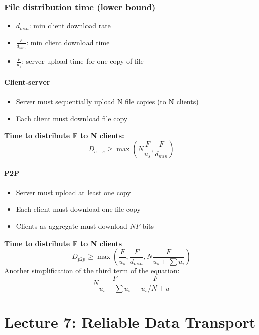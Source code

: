 \documentclass[a4paper]{article}
\begin{document}
\subsubsection{File distribution time (lower bound)}
\begin{itemize}
    \item $d_{min}$: min client download rate
    \item $\displaystyle\frac{F}{d_{min}}$: min client download time
    \item $\displaystyle\frac{F}{u_s}$: server upload time for one copy of file
\end{itemize}

\paragraph{Client-server}
\begin{itemize}
    \item Server must sequentially upload N file copies (to N clients)
    \item Each client must download file copy
\end{itemize}
\textbf{Time to distribute F to N clients:} $$ D_{c-s} \geq \max\left(N\frac{F}{u_s}, \frac{F}{d_{min}}\right)$$

\paragraph{P2P}
\begin{itemize}
    \item Server must upload at least one copy
    \item Each client must download one file copy
    \item Clients as aggregate must download $NF$ bits
\end{itemize}
\textbf{Time to distribute F to N clients} $$ D_{p2p} \geq \max\left(\frac{F}{u_s},\frac{F}{d_{min}}, N\frac{F}{u_s+\sum{u_i}}\right) $$
Another simplification of the third term of the equation: $$N\frac{F}{u_s+\sum{u_i}} = \frac{F}{u_s/N+u} $$

\section{Lecture 7: Reliable Data Transport}
\end{document}
